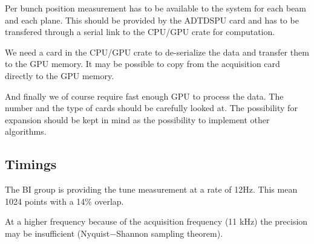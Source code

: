 Per bunch position measurement has to be available to the system for each beam and each plane. This should be provided by the \gls{ADTDSPU} card and has to be transfered through a serial link to the CPU/GPU crate for computation.

We need a card in the CPU/GPU crate to de-serialize the data and transfer them to the GPU memory. It may be possible to copy from the acquisition card directly to the GPU memory.

And finally we of course require fast enough GPU to process the data. The number and the type of cards should be carefully looked at. The possibility for expansion should be kept in mind as the possibility to implement other algorithms.

\subsection{Timings}

The \gls{BI} group is providing the tune measurement at a rate of 12Hz. This mean 1024 points with a 14\% overlap. 

At a higher frequency because of the acquisition frequency (11 kHz) the precision may be insufficient (Nyquist$-$Shannon sampling theorem).